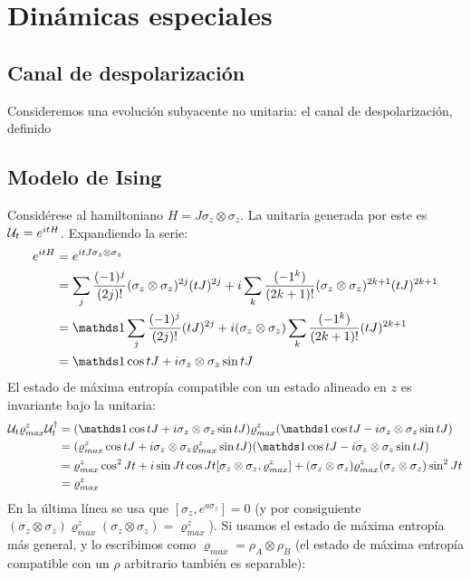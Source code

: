 \section{Dinámicas especiales}
\subsection{Canal de despolarización}

Consideremos una evolución subyacente no unitaria: el canal de despolarización, definido

\subsection{Modelo de Ising}
Considérese al hamiltoniano $H=J\sigma_{z}\otimes\sigma_{z}$. La unitaria generada por este es $\mathcal{U}_{t}=e^{itH}$. Expandiendo la serie:
\begin{align*}
    e^{itH}&=e^{itJ\sigma_{z}\otimes\sigma_{z}}\\
    &=\sum_{j}\frac{(-1)^{j}}{(2j)!}(\sigma_{z}\otimes\sigma_{z})^{2j}(tJ)^{2j}+i\sum_{k}\frac{(-1^{k})}{(2k+1)!}(\sigma_{z}\otimes\sigma_{z})^{2k+1}(tJ)^{2k+1}\\
    &=\Id\sum_{j}\frac{(-1)^{j}}{(2j)!}(tJ)^{2j}+i(\sigma_{z}\otimes\sigma_{z})\sum_{k}\frac{(-1^{k})}{(2k+1)!}(tJ)^{2k+1}\\
    &=\Id \cos{tJ} + i\sigma_{z}\otimes\sigma_{z}\sin{tJ}
\end{align*}
El estado de máxima entropía compatible con un estado alineado en $z$ es invariante bajo la unitaria:
\begin{align*}
    \mcU_{t}\varrho_{max}^{z}\mcU_{t}^{\dag}&=(\Id \cos{tJ} + i\sigma_{z}\otimes\sigma_{z}\sin{tJ})\varrho_{max}^{z}(\Id \cos{tJ} - i\sigma_{z}\otimes\sigma_{z}\sin{tJ})\\
    &=(\varrho_{max}^{z} \cos{tJ} + i\sigma_{z}\otimes\sigma_{z}\varrho_{max}^{z}\sin{tJ})(\Id \cos{tJ} - i\sigma_{z}\otimes\sigma_{z}\sin{tJ})\\
    &=\varrho_{max}^{z} \cos^{2}{Jt}+i\sin{Jt}\cos{Jt}[\sigma_{z}\otimes\sigma_{z},\varrho_{max}^{z}]+(\sigma_{z}\otimes\sigma_{z}) \varrho_{max}^{z} (\sigma_{z}\otimes\sigma_{z}) \sin^{2}{Jt}\\
    &=\varrho_{max}^{z}
\end{align*}
En la última línea se usa que $[\sigma_{z},e^{a\sigma_{z}}]=0$ (y por consiguiente $(\sigma_{z}\otimes\sigma_{z}) \varrho_{max}^{z} (\sigma_{z}\otimes\sigma_{z})=\varrho_{max}^{z}$). Si usamos el estado de máxima entropía más general, y lo escribimos como $\varrho_{max}=\rho_{A}\otimes\rho_{B}$ (el estado de máxima entropía compatible con un $\rho$ arbitrario también es separable):
